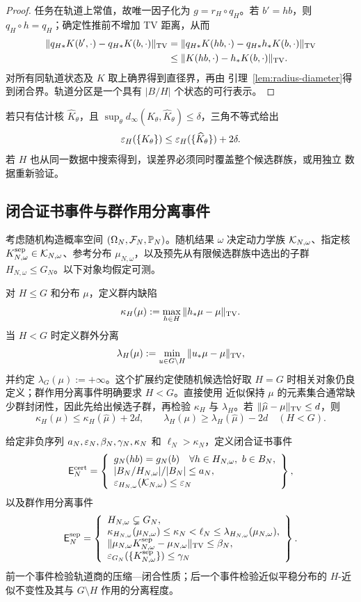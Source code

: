 \begin{proof}
任务在轨道上常值，故唯一因子化为 $g=r_H\circ q_H$。若 $b'=hb$，则
$q_H\circ h=q_H$；确定性推前不增加 TV 距离，从而
\[
\begin{aligned}
\|q_{H*}K(b',\cdot)-q_{H*}K(b,\cdot)\|_{\operatorname{TV}}
&=\|q_{H*}K(hb,\cdot)-q_{H*}h_*K(b,\cdot)\|_{\operatorname{TV}}\\
&\le\|K(hb,\cdot)-h_*K(b,\cdot)\|_{\operatorname{TV}}.
\end{aligned}
\]
对所有同轨道状态及 $K$ 取上确界得到直径界，再由
引理~\ref{lem:radius-diameter}得到闭合界。轨道分区是一个具有
$|B/H|$ 个状态的可行表示。
\end{proof}

若只有估计核 $\widehat K_\theta$，且
$\sup_\theta d_\infty(K_\theta,\widehat K_\theta)\le\delta$，三角不等式给出
\[
\varepsilon_H(\{K_\theta\})
\le
\varepsilon_H(\{\widehat K_\theta\})+2\delta.
\]
若 $H$ 也从同一数据中搜索得到，误差界必须同时覆盖整个候选群族，或用独立
数据重新验证。

\subsection{闭合证书事件与群作用分离事件}

考虑随机构造概率空间 $(\Omega_N,\mathcal F_N,\mathbb P_N)$。随机结果 $\omega$
决定动力学族 $\mathcal K_{N,\omega}$、指定核
$K^{\mathrm{sep}}_{N,\omega}\in\mathcal K_{N,\omega}$、参考分布
$\mu_{N,\omega}$，以及预先从有限候选群族中选出的子群
$H_{N,\omega}\le G_N$。以下对象均假定可测。

对 $H\le G$ 和分布 $\mu$，定义群内缺陷
\[
\kappa_H(\mu):=\max_{h\in H}\|h_*\mu-\mu\|_{\operatorname{TV}}.
\]
当 $H<G$ 时定义群外分离
\[
\lambda_H(\mu):=\min_{u\in G\setminus H}\|u_*\mu-\mu\|_{\operatorname{TV}},
\]
并约定 $\lambda_G(\mu):=+\infty$。这个扩展约定使随机候选恰好取
$H=G$ 时相关对象仍良定义；群作用分离事件明确要求 $H<G$。直接使用
近似保持 $\mu$ 的元素集合通常缺少群封闭性，因此先给出候选子群，再检验
$\kappa_H$ 与 $\lambda_H$。若
$\|\widehat\mu-\mu\|_{\operatorname{TV}}\le d$，则
\[
\kappa_H(\mu)\le\kappa_H(\widehat\mu)+2d,
\qquad
\lambda_H(\mu)\ge\lambda_H(\widehat\mu)-2d
\quad(H<G).
\]

给定非负序列
$a_N,\varepsilon_N,\beta_N,\gamma_N,\kappa_N$ 和
$\ell_N>\kappa_N$，定义闭合证书事件
\[
\mathsf E_N^{\mathrm{cert}}
=\left\{
\begin{array}{l}
g_N(hb)=g_N(b)\quad
  \forall h\in H_{N,\omega},\ b\in B_N,\\
|B_N/H_{N,\omega}|/|B_N|\le a_N,\\
\varepsilon_{H_{N,\omega}}(\mathcal K_{N,\omega})\le\varepsilon_N
\end{array}
\right\},
\]
以及群作用分离事件
\[
\mathsf E_N^{\mathrm{sep}}
=\left\{
\begin{array}{l}
H_{N,\omega}\subsetneq G_N,\\
\kappa_{H_{N,\omega}}(\mu_{N,\omega})\le\kappa_N
<\ell_N\le\lambda_{H_{N,\omega}}(\mu_{N,\omega}),\\
\|\mu_{N,\omega}K^{\mathrm{sep}}_{N,\omega}
  -\mu_{N,\omega}\|_{\operatorname{TV}}\le\beta_N,\\
\varepsilon_{G_N}(\{K^{\mathrm{sep}}_{N,\omega}\})\le\gamma_N
\end{array}
\right\}.
\]
前一个事件检验轨道商的压缩---闭合性质；后一个事件检验近似平稳分布的
$H$-近似不变性及其与 $G\setminus H$ 作用的分离程度。

